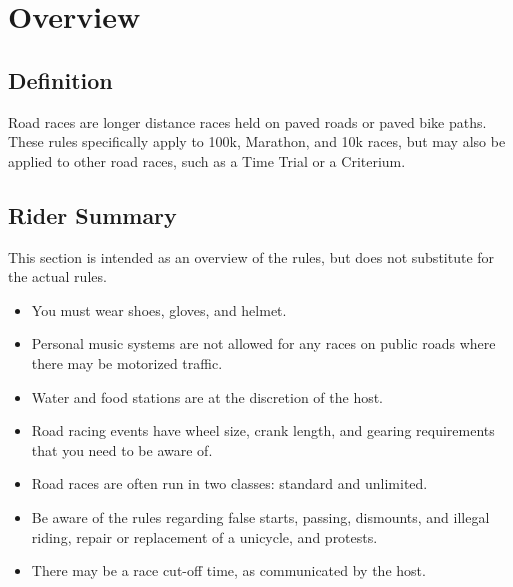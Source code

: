 \chapter{Overview \label{chap:road_racing}}

\section{Definition}

Road races are longer distance races held on paved roads or paved bike paths.
These rules specifically apply to 100k, Marathon, and 10k races, but may also be applied to other road races, such as a Time Trial or a Criterium.

\section{Rider Summary}

This section is intended as an overview of the rules, but does not substitute for the actual rules.
\begin{itemize}
\item You must wear shoes, gloves, and helmet.
\item Personal music systems are not allowed for any races on public roads where there may be motorized traffic.
\item Water and food stations are at the discretion of the host.
\item Road racing events have wheel size, crank length, and gearing 
requirements that you need to be aware of.
\item Road races are often run in two classes: standard and unlimited.
\item Be aware of the rules regarding false starts, passing, dismounts, and illegal riding, repair or replacement of a unicycle, and protests.
\item There may be a race cut-off time, as communicated by the host.
\end{itemize}
